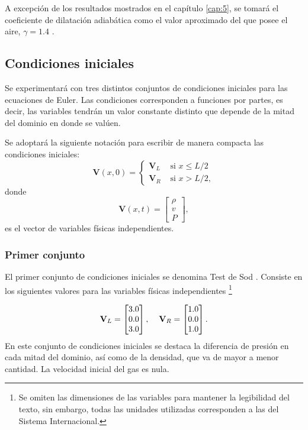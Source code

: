 A excepción de los resultados mostrados en el capítulo \ref{cap:5}, se tomará el coeficiente de dilatación adiabática como el valor aproximado del que posee el aire, $\gamma = 1.4$ \cite{LeVeque}.

\subsection{Condiciones iniciales}
Se experimentará con tres distintos conjuntos de condiciones iniciales para las ecuaciones de Euler. Las condiciones corresponden a funciones por partes, es decir, las variables tendrán un valor constante distinto que depende de la mitad del dominio en donde se valúen.

Se adoptará la siguiente notación para escribir de manera compacta las condiciones iniciales:
\begin{equation}
	\mathbf{V}(x,0) = 
	\begin{cases}
		\mathbf{V}_{L} & \text{ si } x \leq L/2\\
		\mathbf{V}_{R} & \text{ si } x > L/2,
	\end{cases}
\end{equation}
donde
\begin{equation}
\mathbf{V}(x,t) = 
	\begin{bmatrix}
		\rho \\
		v \\
		P
	\end{bmatrix},
\end{equation}
es el vector de variables físicas independientes.

\subsubsection{Primer conjunto}
El primer conjunto de condiciones iniciales se denomina Test de Sod \cite{thesis-euler-godunov}. Consiste en los siguientes valores para las variables físicas independientes \footnote{Se omiten las dimensiones de las variables para mantener la legibilidad del texto, sin embargo, todas las unidades utilizadas corresponden a las del Sistema Internacional.}

\begin{equation}
\mathbf{V}_L = 
	\begin{bmatrix}
		3.0\\
		0.0\\
		3.0
	\end{bmatrix},\hspace{4mm}
\mathbf{V}_R = 
	\begin{bmatrix}
		1.0\\
		0.0\\
		1.0
	\end{bmatrix}.
\end{equation}
En este conjunto de condiciones iniciales se destaca la diferencia de presión en cada mitad del dominio, así como de la densidad, que va de mayor a menor cantidad. La velocidad inicial del gas es nula.

